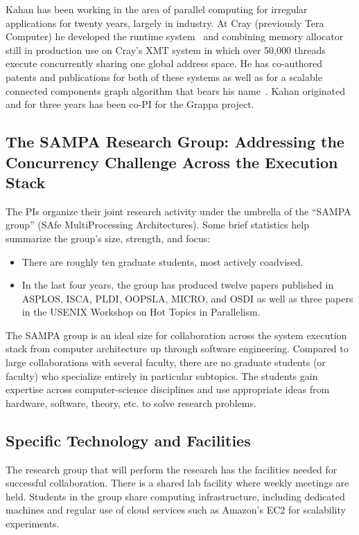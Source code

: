 Kahan has been working in the area of parallel computing for irregular
applications for twenty years, largely in industry.  At Cray (previously Tera
Computer) he developed the runtime system~\cite{Alverson95schedulingon,Alverson97terahardware-software} and combining memory allocator~\cite{MAMA} still in production use on
Cray's XMT system in which over 50,000 threads execute concurrently sharing one
global address space.  He has co-authored patents and publications for both of these
systems as well as for a scalable connected components graph algorithm that bears
his name~\cite{Underwood07analyzingthe}.
Kahan originated and for three years has been co-PI for the Grappa project.

\subsection*{The SAMPA Research Group: Addressing the Concurrency
  Challenge Across the Execution Stack}

The PIs organize their joint research activity under the umbrella of
the ``SAMPA group'' (SAfe MultiProcessing Architectures).  Some brief
statistics help summarize the group's size, strength, and focus:
\begin{itemize}
\item There are roughly ten graduate students, most actively
  coadvised.
\item In the last four years, the group has produced twelve papers
  published in ASPLOS, ISCA, PLDI, OOPSLA, MICRO, and OSDI as well as three
  papers in the USENIX Workshop on Hot Topics in Parallelism.
\end{itemize}
The SAMPA group is an ideal size for collaboration across the system
execution stack from computer architecture up through software
engineering.  Compared to large collaborations with several faculty,
there are no graduate students (or faculty) who specialize entirely in
particular subtopics.  The students gain expertise across
computer-science disciplines and use appropriate ideas from hardware,
software, theory, etc. to solve research problems.  

\subsection*{Specific Technology and Facilities}

The research group that will perform the research has the facilities
needed for successful collaboration.  There is a shared lab facility
where weekly meetings are held.  Students in the group share computing
infrastructure, including dedicated machines and regular use of cloud
services such as Amazon's EC2 for scalability experiments.

